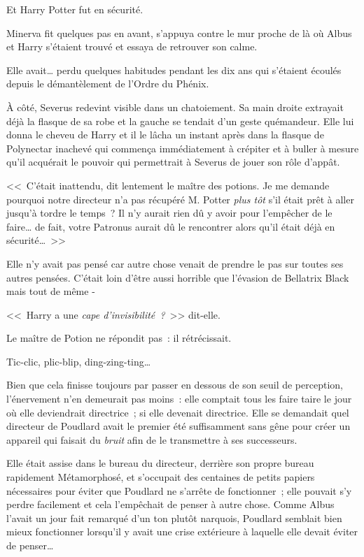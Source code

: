 Et Harry Potter fut en sécurité.

Minerva fit quelques pas en avant, s'appuya contre le mur proche de là où Albus et Harry s'étaient trouvé et essaya de retrouver son calme.

Elle avait… perdu quelques habitudes pendant les dix ans qui s'étaient écoulés depuis le démantèlement de l'Ordre du Phénix.

À côté, Severus redevint visible dans un chatoiement. Sa main droite extrayait déjà la flasque de sa robe et la gauche se tendait d'un geste quémandeur. Elle lui donna le cheveu de Harry et il le lâcha un instant après dans la flasque de Polynectar inachevé qui commença immédiatement à crépiter et à buller à mesure qu'il acquérait le pouvoir qui permettrait à Severus de jouer son rôle d'appât.

<<~C'était inattendu, dit lentement le maître des potions. Je me demande pourquoi notre directeur n'a pas récupéré M. Potter \emph{plus tôt} s'il était prêt à aller jusqu'à tordre le temps~? Il n'y aurait rien dû y avoir pour l'empêcher de le faire… de fait, votre Patronus aurait dû le rencontrer alors qu'il était déjà en sécurité…~>>

Elle n'y avait pas pensé car autre chose venait de prendre le pas sur toutes ses autres pensées. C'était loin d'être aussi horrible que l'évasion de Bellatrix Black mais tout de même -

<<~Harry a une \emph{cape d'invisibilité~?}~>> dit-elle.

Le maître de Potion ne répondit pas~: il rétrécissait.

\later

Tic-clic, plic-blip, ding-zing-ting…

Bien que cela finisse toujours par passer en dessous de son seuil de perception, l'énervement n'en demeurait pas moins~: elle comptait tous les faire taire le jour où elle deviendrait directrice~; si elle devenait directrice. Elle se demandait quel directeur de Poudlard avait le premier été suffisamment sans gêne pour créer un appareil qui faisait du \emph{bruit} afin de le transmettre à ses successeurs.

Elle était assise dans le bureau du directeur, derrière son propre bureau rapidement Métamorphosé, et s'occupait des centaines de petits papiers nécessaires pour éviter que Poudlard ne s'arrête de fonctionner~; elle pouvait s'y perdre facilement et cela l'empêchait de penser à autre chose. Comme Albus l'avait un jour fait remarqué d'un ton plutôt narquois, Poudlard semblait bien mieux fonctionner lorsqu'il y avait une crise extérieure à laquelle elle devait éviter de penser…

